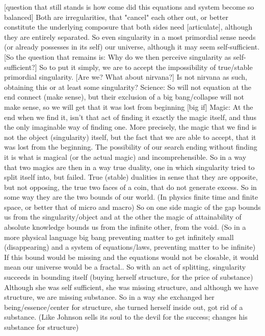 \documentclass{book}
\begin{document}
[question that still stands is how come did this equations and system become so balanced]
Both are irregularities, that "cancel" each other out, or better constitute the underlying composure that both sides need [articulate], although they are entirely separated.
So even singularity in a most primordial sense needs (or already possesses in its self) our universe, although it may seem self-sufficient. 
[So the question that remains is: Why do we then perceive singularity as self-sufficient?] So to put it simply, we are to accept the impossibility of true/stable primordial singularity. [Are we? What about nirvana?] Is not nirvana as such, obtaining this or at least some singularity?
Science:
So will not equation at the end connect (make sense), but their exclusion of a big bang/collapse will not make sense, so we will get that it was lost from beginning [big if]
Magic:
At the end when we find it, isn't that act of finding it exactly the magic itself, and thus the only imaginable way of finding one. More precisely, the magic that we find is not the object (singularity) itself, but the fact that we are able to accept, that it was lost from the beginning. The possibility of our search ending without finding it is what is magical (or the actual magic) and incomprehensible.
So in a way that two magics are then in a way true duality, one in which singularity tried to split itself into, but failed. True (stable) dualities in sense that they are opposite, but not opposing, the true two faces of a coin, that do not generate excess. So in some way they are the two bounds of our world. (In physics finite time and finite space, or better that of micro and macro) So on one side magic of the gap bounds us from the singularity/object and at the other the magic of attainability of absolute knowledge bounds us from the infinite other, from the void. (So in a more physical language big bang preventing matter to get infinitely small (disappearing) and a system of equations/laws, preventing matter to be infinite) If this bound would be missing and the equations would not be closable, it would mean our universe would be a fractal..
So with an act of splitting, singularity succeeds in bounding itself (buying herself structure, for the price of substance) Although she was self sufficient, she was missing structure, and although we have structure, we are missing substance. So in a way she exchanged her being/essence/center for structure, she turned herself inside out, got rid of a substance. (Like Johnson sells its soul to the devil for the success; changes his substance for structure)
\end{document}
